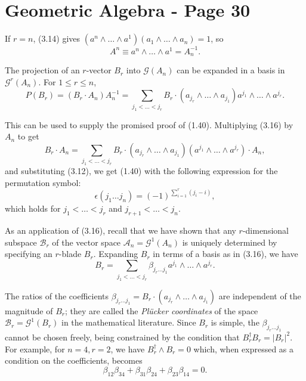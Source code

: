 \documentclass[fleqn]{scrartcl}
\numberwithin{equation}{section}
\begin{document}
\section*{Geometric Algebra - Page 30}

\noindent If \(r = n\), (3.14) gives \((a^n \wedge \dots \wedge a^1)(a_1 \wedge \dots \wedge a_n) = 1\), so
\begin{equation}
A^n \equiv a^n \wedge \dots \wedge a^1 = A_n^{-1}. \tag{3.15}
\end{equation}

\vspace{1em}
\noindent The projection of an \(r\)-vector \(B_r\) into \(\mathscr{G}(A_n)\) can be expanded in a basis in \(\mathscr{G}^r(A_n)\). For \(1 \leq r \leq n\),
\begin{equation}
P(B_r) = (B_r \cdot A_n)A_n^{-1} = \sum_{j_1 < \dots < j_r} B_r \cdot (a_{j_r} \wedge \dots \wedge a_{j_1}) a^{j_1} \wedge \dots \wedge a^{j_r}. \tag{3.16}
\end{equation}

\noindent This can be used to supply the promised proof of (1.40). Multiplying (3.16) by \(A_n\) to get
\[
B_r \cdot A_n = \sum_{j_1 < \dots < j_r} B_r \cdot (a_{j_r} \wedge \dots \wedge a_{j_1}) (a^{j_1} \wedge \dots \wedge a^{j_r}) \cdot A_n,
\]
and substituting (3.12), we get (1.40) with the following expression for the permutation symbol:
\begin{equation}
\epsilon(j_1 \dots j_n) = (-1)^{\sum_{i=1}^r (j_i - i)}, \tag{3.17}
\end{equation}
which holds for \(j_1 < \dots < j_r\) and \(j_{r+1} < \dots < j_n\).

\vspace{1em}
\noindent As an application of (3.16), recall that we have shown that any \(r\)-dimensional subspace \(\mathscr{B}_r\) of the vector space \(\mathscr{A}_n = \mathscr{G}^1(A_n)\) is uniquely determined by specifying an \(r\)-blade \(B_r\). Expanding \(B_r\) in terms of a basis as in (3.16), we have
\[
B_r = \sum_{j_1 < \dots < j_r} \beta_{j_r \dots j_1} a^{j_1} \wedge \dots \wedge a^{j_r}.
\]

\noindent The ratios of the coefficients \(\beta_{j_r \dots j_1} = B_r \cdot (a_{j_r} \wedge \dots \wedge a_{j_1})\) are independent of the magnitude of \(B_r\); they are called the \textit{Plücker coordinates} of the space \(\mathscr{B}_r = \mathscr{G}^1(B_r)\) in the mathematical literature. Since \(B_r\) is simple, the \(\beta_{j_r \dots j_1}\) cannot be chosen freely, being constrained by the condition that \(B_r^{\dagger} B_r = |B_r|^2\). For example, for \(n = 4, r = 2\), we have \(B_r^{\dagger} \wedge B_r = 0\) which, when expressed as a condition on the coefficients, becomes
\[
\beta_{12}\beta_{34} + \beta_{31}\beta_{24} + \beta_{23}\beta_{14} = 0.
\]
\end{document}
